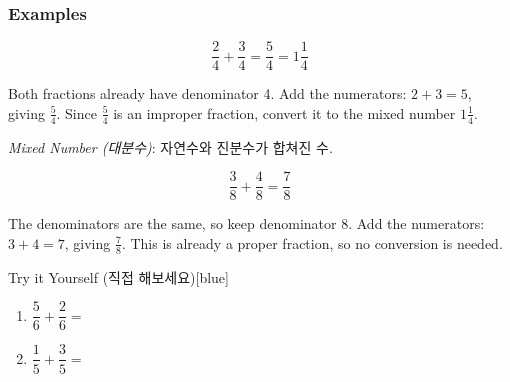 \documentclass[12pt]{book}
\begin{document}
\subsubsection*{Examples}

\[
\dfrac{2}{4} + \dfrac{3}{4} = \dfrac{5}{4} = 1 \dfrac{1}{4}
\]

Both fractions already have denominator 4.  
Add the numerators: $2+3=5$, giving $\tfrac{5}{4}$.  
Since $\tfrac{5}{4}$ is an improper fraction, convert it to the mixed number $1 \tfrac{1}{4}$.  

\textit{Mixed Number (대분수)}: 자연수와 진분수가 합쳐진 수.




\[
\dfrac{3}{8} + \dfrac{4}{8} = \dfrac{7}{8}
\]

The denominators are the same, so keep denominator 8.  
Add the numerators: $3+4=7$, giving $\tfrac{7}{8}$.  
This is already a proper fraction, so no conversion is needed.  


\begin{flexbox}{Try it Yourself (직접 해보세요)}[blue]
\begin{enumerate}
  \item $\dfrac{5}{6}+\dfrac{2}{6}=$ \vspace*{20pt}
  \item $\dfrac{1}{5}+\dfrac{3}{5}=$ \vspace*{20pt}
\end{enumerate}
\end{flexbox}


\end{document}
